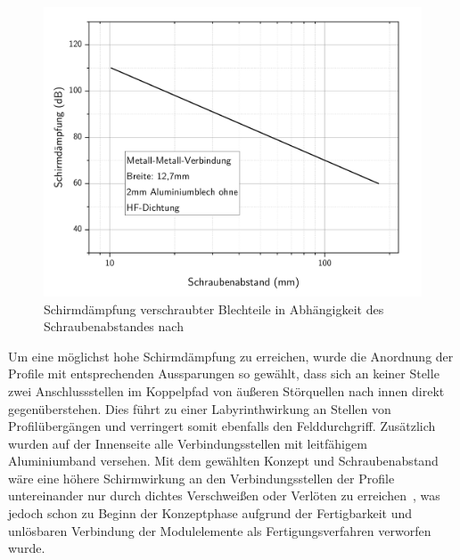 \begin{figure}[ht]
    \centering
    \includegraphics[page = 1, trim = 0cm 0cm 0cm 0cm, clip, width=.65\textwidth]{Abbildungen/Kapitel3/Schraubenabstand_Schirmwirkung.pdf}
    \caption[Schirmdämpfung verschraubter Blechteile in Abhängigkeit des Schraubenabstandes]{Schirmdämpfung verschraubter Blechteile in Abhängigkeit des Schraubenabstandes nach~\cite{Design_of_shielded_enclosures}}
    \label{fig:3_Schirmwirkung_Schraubenabstand}
\end{figure}

\par
\vspace{\linespace}
Um eine möglichst hohe Schirmdämpfung zu erreichen, wurde die Anordnung der Profile mit entsprechenden Aussparungen so gewählt, dass sich an keiner Stelle zwei Anschlussstellen im Koppelpfad von äußeren Störquellen nach innen direkt gegenüberstehen. Dies führt zu einer Labyrinthwirkung an Stellen von Profilübergängen und verringert somit ebenfalls den Felddurchgriff. Zusätzlich wurden auf der Innenseite alle Verbindungsstellen mit leitfähigem Aluminiumband versehen. Mit dem gewählten Konzept und Schraubenabstand wäre eine höhere Schirmwirkung an den Verbindungsstellen der Profile untereinander nur durch dichtes Verschweißen oder Verlöten zu erreichen~\cite{Design_of_shielded_enclosures, EM_Schirmung}, was jedoch schon zu Beginn der Konzeptphase aufgrund der Fertigbarkeit und unlösbaren Verbindung der Modulelemente als Fertigungsverfahren verworfen wurde. 
\par
\vspace{\linespace}


    

